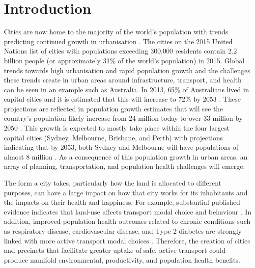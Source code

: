 \documentclass[10pt,letterpaper]{article}
\begin{document}
 

\linenumbers



\section*{Introduction}\label{sec:introduction}

Cities are now home to the majority of the world's population with trends predicting continued growth in urbanisation \cite{UNDESA2015,WHO2016}. The cities on the 2015 United Nations list of cities with populations exceeding 300,000 residents \cite{UN2014} contain 2.2 billion people (or approximately 31\% of the world's population) in 2015. Global trends towards high urbanisation and rapid population growth and the challenges these trends create in urban areas around infrastructure, transport, and health can be seen in an example such as Australia. In 2013, 65\% of Australians lived in capital cities and it is estimated that this will increase to 72\% by 2053  \cite{ABS2008}. These projections are reflected in population growth estimates that will see the country's population likely increase from 24 million today to over 33 million by 2050 \cite{ABS2008}. This growth is expected to mostly take place within the four largest capital cities (Sydney, Melbourne, Brisbane, and Perth) with projections indicating that by 2053, both Sydney and Melbourne will have populations of almost 8 million \cite{CommonwealthofAustralia2010}. As a consequence of this population growth in urban areas, an array of planning, transportation, and population health challenges will emerge.

The form a city takes, particularly how the land is allocated to different purposes, can have a large impact on how that city works for its inhabitants and the impacts on their health and happiness. For example, substantial published evidence indicates that land-use affects transport modal choice and behaviour  \cite{Giles-corti2016,Kleinert2016,Goenka2016}. In addition, improved population health outcomes related to chronic conditions such as respiratory disease, cardiovascular disease, and Type 2 diabetes are strongly linked with more active transport modal choices \cite{Zapata-Diomedi2017}. Therefore, the creation of cities and precincts that facilitate greater uptake of safe, active transport could produce manifold environmental, productivity, and population health benefits.
\end{document}
